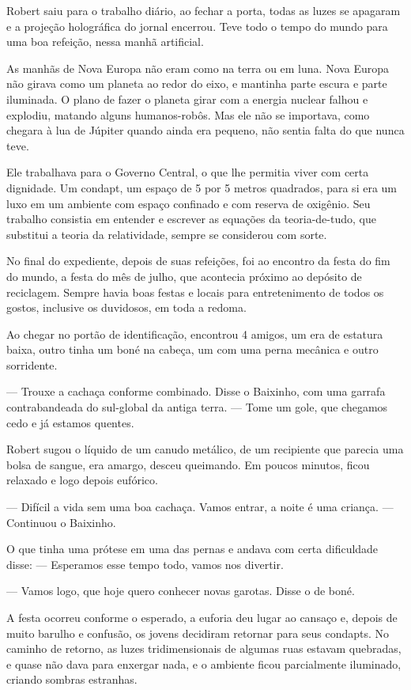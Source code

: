 \documentclass[a4paper,14pt]{book}
\begin{document}
Robert saiu para o trabalho diário, ao fechar a porta, todas as luzes se apagaram e a projeção holográfica do jornal encerrou. Teve todo o tempo do mundo para uma boa refeição, nessa manhã artificial.

As manhãs de Nova Europa não eram como na terra ou em luna. Nova Europa não girava como um planeta ao redor do eixo, e mantinha parte escura e parte iluminada. O plano de fazer o planeta girar com a energia nuclear falhou e explodiu, matando alguns humanos-robôs. Mas ele não se importava, como chegara à lua de Júpiter quando ainda era pequeno, não sentia falta do que nunca teve.

Ele trabalhava para o Governo Central, o que lhe permitia viver com certa dignidade. Um condapt, um espaço de 5 por 5 metros quadrados, para si era um luxo em um ambiente com espaço confinado e com reserva de oxigênio. Seu trabalho consistia em entender e escrever as equações da teoria-de-tudo, que substitui a teoria da relatividade, sempre se considerou com sorte.

No final do expediente, depois de suas refeições, foi ao encontro da festa do fim do mundo, a festa do mês de julho, que acontecia próximo ao depósito de reciclagem. Sempre havia boas festas e locais para entretenimento de todos os gostos, inclusive os duvidosos, em toda a redoma.

Ao chegar no portão de identificação, encontrou 4 amigos, um era de estatura baixa, outro tinha um boné na cabeça, um com uma perna mecânica e outro sorridente.

— Trouxe a cachaça conforme combinado. Disse o Baixinho, com uma garrafa contrabandeada do sul-global da antiga terra. — Tome um gole, que chegamos cedo e já estamos quentes.

Robert sugou o líquido de um canudo metálico, de um recipiente que parecia uma bolsa de sangue, era amargo, desceu queimando. Em poucos minutos, ficou relaxado e logo depois eufórico.

— Difícil a vida sem uma boa cachaça. Vamos entrar, a noite é uma criança. — Continuou o Baixinho.

O que tinha uma prótese em uma das pernas e andava com certa dificuldade disse: — Esperamos esse tempo todo, vamos nos divertir.

— Vamos logo, que hoje quero conhecer novas garotas. Disse o de boné.

A festa ocorreu conforme o esperado, a euforia deu lugar ao cansaço e, depois de muito barulho e confusão, os jovens decidiram retornar para seus condapts. No caminho de retorno, as luzes tridimensionais de algumas ruas estavam quebradas, e quase não dava para enxergar nada, e o ambiente ficou parcialmente iluminado, criando sombras estranhas.
\end{document}
